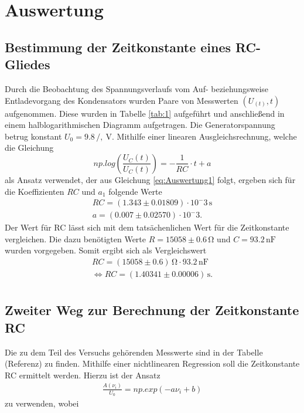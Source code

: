 \section{Auswertung}
\label{sec:Auswertung}

\subsection{Bestimmung der Zeitkonstante eines RC-Gliedes}

Durch die Beobachtung des Spannungsverlaufs vom Auf- beziehungsweise Entladevorgang des 
Kondensators wurden Paare von Messwerten $(U_(t),t)$ aufgenommen. Diese wurden in 
Tabelle \ref{tab:1} aufgeführt und anschließend in einem halblogarithmischen Diagramm
aufgetragen. Die Generatorspannung betrug
konstant $U_0 = 9.8\,/,\ \si{\volt}$. Mithilfe einer linearen Ausgleichsrechnung,
welche die Gleichung 
\begin{equation}
np.log(\frac{U_C(t)}{U_C(t)}) = -\frac{1}{RC} \cdot t + a
\end{equation}
\noindent
als Ansatz verwendet, der aus Gleichung \ref{eq:Auswertung1} folgt, ergeben sich für die 
Koeffizienten $RC$ und $a_1$ folgende Werte
\begin{align}
RC  =  (1.343 \pm 0.01809) \cdot 10^-3\, {\si{\second}}      \nonumber \\
a =  (0.007 \pm 0.02570) \cdot 10^-3.                      \nonumber
\end{align}
\noindent
Der Wert für RC lässt sich mit dem tatsächenlichen Wert für die Zeitkonstante vergleichen. 
Die dazu benötigten Werte $R = 15058 \pm 0.6\, \si{\ohm}$ und $C = 93.2\, \si{\nano\farad}$ 
wurden vorgegeben. Somit ergibt sich als Vergleichswert 
\begin{align}
RC = (15058 \pm 0.6)\, \si{\ohm} \cdot 93.2\, \si{\nano\farad} \nonumber \\
\iff RC = (1.40341 \pm 0.00006)\, \si{\second}.  \nonumber \\
\end{align}














\subsection{Zweiter Weg zur Berechnung der Zeitkonstante RC}
Die zu dem Teil des Versuchs gehörenden Messwerte sind in der Tabelle (Referenz) zu finden.
Mithilfe einer nichtlinearen Regression soll die Zeitkonstante RC ermittelt werden. Hierzu
ist der Ansatz
\begin{align}
    \frac{A(\nu_i)}{U_0} = np.exp(-a\nu_i+b)
\end{align}
\noindent
zu verwenden, wobei 


